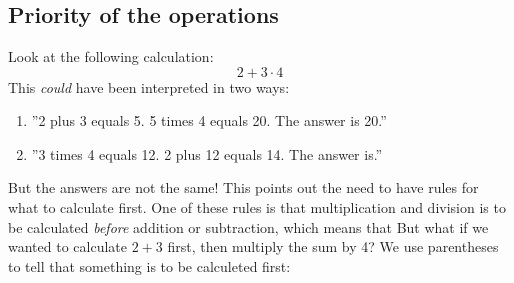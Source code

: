 



\section{\rrek}
\subsection*{Priority of the operations}
Look at the following calculation:
\[ 2+3\cdot4 \]
This \textsl{could} have been interpreted in two ways:
\begin{enumerate}
	\item ''2 plus 3 equals 5. 5 times 4 equals 20. The answer is 20.''
	\item ''3 times 4 equals 12. 2 plus 12 equals 14. The answer is.''
\end{enumerate}
But the answers are not the same! This points out the need to have rules for what to calculate first. One of these rules is that multiplication and division is to be calculated \textsl{before} addition or subtraction, which means that \regv
\st{ \vs
{}
}
But what if we wanted to calculate $ 2+3 $ first, then multiply the sum by 4? We use parentheses to tell that something is to be calculeted first: \regv
\st{\vs
{}
}\regv

\newpage
{}
